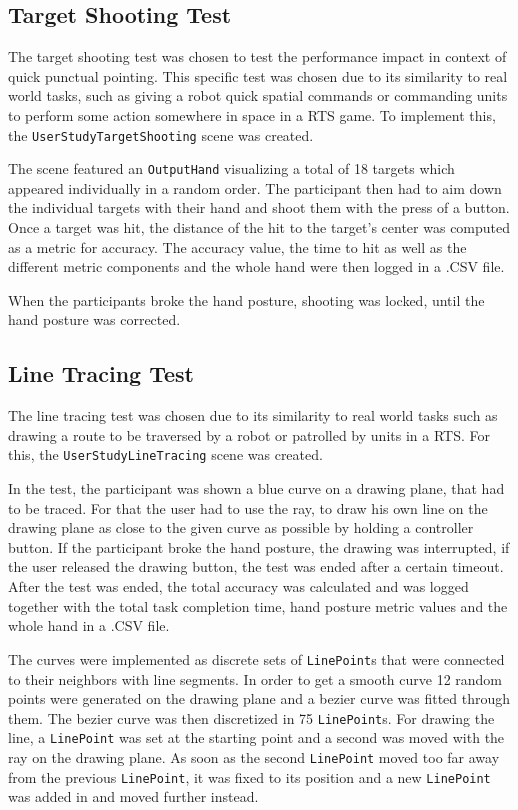 \subsection{Target Shooting Test}

The target shooting test was chosen to test the performance impact in context of quick punctual pointing. This specific test was chosen due to its similarity to real world tasks, such as giving a robot quick spatial commands or commanding units to perform some action somewhere in space in a RTS game. To implement this, the \texttt{UserStudyTargetShooting} scene was created.

The scene featured an \texttt{OutputHand} visualizing a total of 18 targets which appeared individually in a random order. The participant then had to aim down the individual targets with their hand and shoot them with the press of a button.
Once a target was hit, the distance of the hit to the target's center was computed as a metric for accuracy. The accuracy value, the time to hit as well as the different metric components and the whole hand were then logged in a .CSV file.  

When the participants broke the hand posture, shooting was locked, until the hand posture was corrected. 

\subsection{Line Tracing Test}

The line tracing test was chosen due to its similarity to real world tasks such as drawing a route to be traversed by a robot or patrolled by units in a RTS.
For this, the \texttt{UserStudyLineTracing} scene was created.

In the test, the participant was shown a blue curve on a drawing plane, that had to be traced. For that the user had to use the ray, to draw his own line on the drawing plane as close to the given curve as possible by holding a controller button. If the participant broke the hand posture, the drawing was interrupted, if the user released the drawing button, the test was ended after a certain timeout.
After the test was ended, the total accuracy was calculated and was logged together with the total task completion time, hand posture metric values and the whole hand in a .CSV file.

The curves were implemented as discrete sets of \texttt{LinePoint}s that were connected to their neighbors with line segments. In order to get a smooth curve 12 random points were generated on the drawing plane and a bezier curve was fitted through them. The bezier curve was then discretized in 75 \texttt{LinePoint}s. For drawing the line, a \texttt{LinePoint} was set at the starting point and a second was moved with the ray on the drawing plane. As soon as the second \texttt{LinePoint} moved too far away from the previous \texttt{LinePoint}, it was fixed to its position and a new \texttt{LinePoint} was added in and moved further instead.

